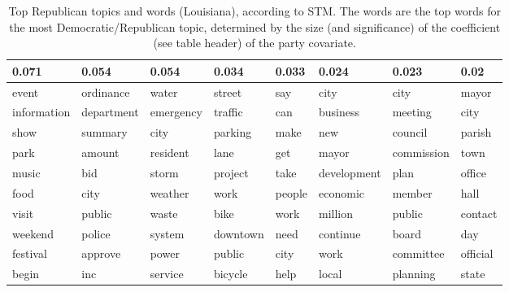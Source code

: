 \begin{table}[ht]
\centering
\begin{tabular}{llllllll}
  \hline
0.071 & 0.054 & 0.054 & 0.034 & 0.033 & 0.024 & 0.023 & 0.02 \\ 
  \hline
event & ordinance & water & street & say & city & city & mayor \\ 
  information & department & emergency & traffic & can & business & meeting & city \\ 
  show & summary & city & parking & make & new & council & parish \\ 
  park & amount & resident & lane & get & mayor & commission & town \\ 
  music & bid & storm & project & take & development & plan & office \\ 
  food & city & weather & work & people & economic & member & hall \\ 
  visit & public & waste & bike & work & million & public & contact \\ 
  weekend & police & system & downtown & need & continue & board & day \\ 
  festival & approve & power & public & city & work & committee & official \\ 
  begin & inc & service & bicycle & help & local & planning & state \\ 
   \hline
\end{tabular}
\caption{Top Republican topics and words (Louisiana), according to STM. 
The words are the top words for the most Democratic/Republican topic, determined
by the size (and significance) of the coefficient (see table header) of the party covariate.} 
\label{tabSTMLARep}
\end{table}

